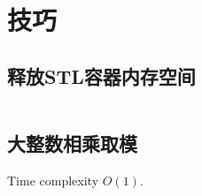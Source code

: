 \chapter{技巧}
\section{释放STL容器内存空间}
\inputminted{cpp}{\source/tricks/truly-release-container-space.cpp}
\section{大整数相乘取模}
Time complexity $O(1)$.
\inputminted{cpp}{\source/tricks/O1-multiply-mod.cpp}
